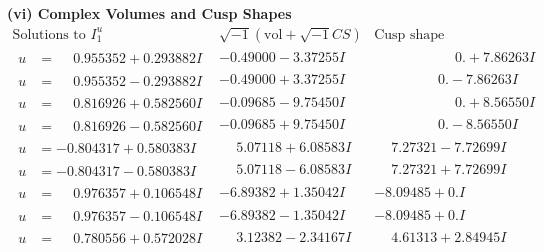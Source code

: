 \documentclass[1p]{elsarticle_modified}
\theoremstyle{definition}
\newcommand{\I}{\sqrt{-1}}
\begin{document}
\newpage\flushleft \textbf{(vi) Complex Volumes and Cusp Shapes}
$$\begin{array}{c|c|c}  
\text{Solutions to }I^u_{1}& \I (\text{vol} + \sqrt{-1}CS) & \text{Cusp shape}\\
 \hline 
\begin{aligned}
u &= \phantom{-}0.955352 + 0.293882 I\end{aligned}
 & -0.49000 - 3.37255 I & \phantom{-0.000000 -}0. + 7.86263 I \\ \hline\begin{aligned}
u &= \phantom{-}0.955352 - 0.293882 I\end{aligned}
 & -0.49000 + 3.37255 I & \phantom{-0.000000 } 0. - 7.86263 I \\ \hline\begin{aligned}
u &= \phantom{-}0.816926 + 0.582560 I\end{aligned}
 & -0.09685 - 9.75450 I & \phantom{-0.000000 -}0. + 8.56550 I \\ \hline\begin{aligned}
u &= \phantom{-}0.816926 - 0.582560 I\end{aligned}
 & -0.09685 + 9.75450 I & \phantom{-0.000000 } 0. - 8.56550 I \\ \hline\begin{aligned}
u &= -0.804317 + 0.580383 I\end{aligned}
 & \phantom{-}5.07118 + 6.08583 I & \phantom{-}7.27321 - 7.72699 I \\ \hline\begin{aligned}
u &= -0.804317 - 0.580383 I\end{aligned}
 & \phantom{-}5.07118 - 6.08583 I & \phantom{-}7.27321 + 7.72699 I \\ \hline\begin{aligned}
u &= \phantom{-}0.976357 + 0.106548 I\end{aligned}
 & -6.89382 + 1.35042 I & -8.09485 + 0. I\phantom{ +0.000000I} \\ \hline\begin{aligned}
u &= \phantom{-}0.976357 - 0.106548 I\end{aligned}
 & -6.89382 - 1.35042 I & -8.09485 + 0. I\phantom{ +0.000000I} \\ \hline\begin{aligned}
u &= \phantom{-}0.780556 + 0.572028 I\end{aligned}
 & \phantom{-}3.12382 - 2.34167 I & \phantom{-}4.61313 + 2.84945 I \\ \hline\begin{aligned}

\end{aligned}
\end{array}$$
\end{document}
